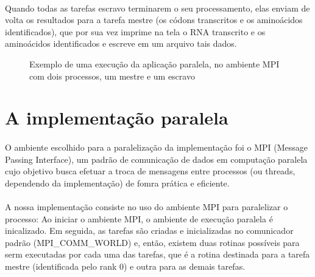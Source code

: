 \documentclass[a4paper,10pt]{article}
\begin{document}
\paragraph{}Quando todas as tarefas escravo terminarem o seu processamento, elas enviam de volta os resultados para a tarefa mestre (os códons transcritos e os aminoácidos identificados), que por sua vez imprime na tela o RNA transcrito e os aminoácidos identificados e escreve em um arquivo tais dados.

\begin{figure}[!htb]
\centering
{}
\quad
{}
\caption{Exemplo de uma execução da aplicação paralela, no ambiente MPI com dois processos, um mestre e um escravo}
\label{Figura 1}
\end{figure}

\newpage

\section{A implementação paralela}
\paragraph{}O ambiente escolhido para a paralelização da implementação foi o MPI (Message Passing Interface), um padrão de comunicação de dados em computação paralela cujo objetivo busca efetuar a troca de mensagens entre processos (ou threads, dependendo da implementação) de fomra prática e eficiente.\\
\paragraph{} A nossa implementação consiste no uso do ambiente MPI para paralelizar o processo: Ao iniciar o ambiente MPI, o ambiente de execução paralela é inicalizado. Em seguida, as tarefas são criadas e inicializadas no comunicador padrão (MPI\_COMM\_WORLD) e, então, existem duas rotinas possíveis para serm executadas por cada uma das tarefas, que é a rotina destinada para a tarefa mestre (identificada pelo rank 0) e outra para as demais tarefas.\\
\end{document}

